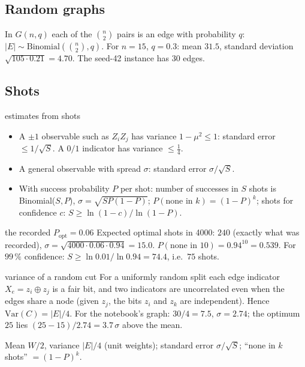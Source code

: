 \documentclass[11pt,a4paper,openany]{book}
\newcounter{wex}[chapter]
\begin{document}
\subsection{Random graphs}
In $G(n, q)$ each of the $\binom n2$ pairs is an edge with probability $q$: $|E| \sim \mathrm{Binomial}(\binom n2, q)$. For $n = 15$,
$q = 0.3$: mean $31.5$, standard deviation $\sqrt{105\cdot0.21} = 4.70$. The seed-42 instance has 30 edges.

\subsection{Shots}
\begin{method}{estimates from shots}
\begin{itemize}[itemsep=1pt]
\item A $\pm1$ observable such as $Z_iZ_j$ has variance $1 - \mu^2 \le 1$: standard error $\le 1/\sqrt S$. A $0/1$ indicator has variance $\le\frac14$.
\item A general observable with spread $\sigma$: standard error $\sigma/\sqrt S$.
\item With success probability $P$ per shot: number of successes in $S$ shots is Binomial($S, P$), $\sigma = \sqrt{SP(1-P)}$;
$P(\text{none in } k) = (1-P)^k$; shots for confidence $c$: $S \ge \ln(1-c)/\ln(1-P)$.
\end{itemize}
\end{method}
\begin{wexample}{the recorded $P_{\text{opt}} = 0.06$}
Expected optimal shots in 4000: $240$ (exactly what was recorded), $\sigma = \sqrt{4000\cdot0.06\cdot0.94} = 15.0$.
$P(\text{none in } 10) = 0.94^{10} = 0.539$. For $99\,\%$ confidence: $S \ge \ln0.01/\ln0.94 = 74.4$, i.e.\ $75$ shots.
\end{wexample}

\begin{wexample}{variance of a random cut}
For a uniformly random split each edge indicator $X_e = z_i\oplus z_j$ is a fair bit, and two indicators are uncorrelated even when the edges share a
node (given $z_j$, the bits $z_i$ and $z_k$ are independent). Hence $\mathrm{Var}(C) = |E|/4$. For the notebook's graph: $30/4 = 7.5$,
$\sigma = 2.74$; the optimum $25$ lies $(25 - 15)/2.74 = 3.7\,\sigma$ above the mean.
\end{wexample}
\begin{checklist}
Mean $W/2$, variance $|E|/4$ (unit weights); standard error $\sigma/\sqrt S$; ``none in $k$ shots'' $= (1-P)^k$.
\end{checklist}
\end{document}
